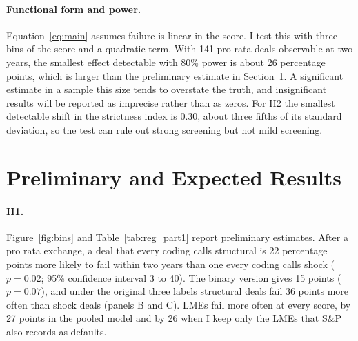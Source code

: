 \documentclass[12pt]{article}
\begin{document}
\paragraph{Functional form and power.} Equation~\eqref{eq:main} assumes failure is linear in the score. I test this with three bins of the score and a quadratic term. With 141 pro rata deals observable at two years, the smallest effect detectable with 80\% power is about 26 percentage points, which is larger than the preliminary estimate in Section~\ref{sec:results}. A significant estimate in a sample this size tends to overstate the truth, and insignificant results will be reported as imprecise rather than as zeros. For H2 the smallest detectable shift in the strictness index is 0.30, about three fifths of its standard deviation, so the test can rule out strong screening but not mild screening.

\section{Preliminary and Expected Results}
\label{sec:results}

\paragraph{H1.} Figure~\ref{fig:bins} and Table~\ref{tab:reg_part1} report preliminary estimates. After a pro rata exchange, a deal that every coding calls structural is 22 percentage points more likely to fail within two years than one every coding calls shock ($p = 0.02$; 95\% confidence interval 3 to 40). The binary version gives 15 points ($p = 0.07$), and under the original three labels structural deals fail 36 points more often than shock deals (panels B and C). LMEs fail more often at every score, by 27 points in the pooled model and by 26 when I keep only the LMEs that S\&P also records as defaults.
\end{document}
